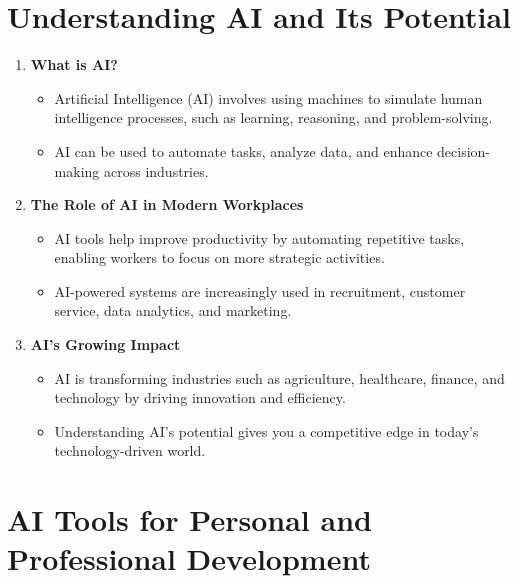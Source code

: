 \documentclass[
  letterpaper,
  DIV=11,
  numbers=noendperiod]{scrreprt}
\providecommand{\tightlist}{%
  \setlength{\itemsep}{0pt}\setlength{\parskip}{0pt}}\usepackage{longtable,booktabs,array}
\begin{document}
\section{Understanding AI and Its
Potential}\label{understanding-ai-and-its-potential}

\begin{enumerate}
\def\labelenumi{\arabic{enumi}.}
\item
  \textbf{What is AI?}

  \begin{itemize}
  \tightlist
  \item
    Artificial Intelligence (AI) involves using machines to simulate
    human intelligence processes, such as learning, reasoning, and
    problem-solving.
  \item
    AI can be used to automate tasks, analyze data, and enhance
    decision-making across industries.
  \end{itemize}
\item
  \textbf{The Role of AI in Modern Workplaces}

  \begin{itemize}
  \tightlist
  \item
    AI tools help improve productivity by automating repetitive tasks,
    enabling workers to focus on more strategic activities.
  \item
    AI-powered systems are increasingly used in recruitment, customer
    service, data analytics, and marketing.
  \end{itemize}
\item
  \textbf{AI's Growing Impact}

  \begin{itemize}
  \tightlist
  \item
    AI is transforming industries such as agriculture, healthcare,
    finance, and technology by driving innovation and efficiency.
  \item
    Understanding AI's potential gives you a competitive edge in today's
    technology-driven world.
  \end{itemize}
\end{enumerate}

\section{AI Tools for Personal and Professional
Development}\label{ai-tools-for-personal-and-professional-development}
\end{document}
